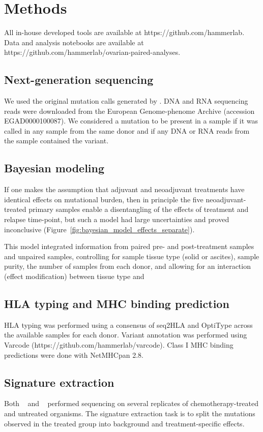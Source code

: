 \section*{Methods}
All in-house developed tools are available at https://github.com/hammerlab. Data and analysis notebooks are available at https://github.com/hammerlab/ovarian-paired-analyses.

\subsection*{Next-generation sequencing}
We used the original mutation calls generated by \cite{Patch_2015}. DNA and RNA sequencing reads were downloaded from the European Genome-phenome Archive (accession EGAD0000100087). We considered a mutation to be present in a sample if it was called in any sample from the same donor and if any DNA or RNA reads from the sample contained the variant.

\subsection*{Bayesian modeling}
If one makes the assumption that adjuvant and neoadjuvant treatments have identical effects on mutational burden, then in principle the five neoadjuvant-treated primary samples enable a disentangling of the effects of treatment and relapse time-point, but such a model had large uncertainties and proved inconclusive (Figure~\ref{fig:bayesian_model_effects_separate}). 

This model integrated information from paired pre- and post-treatment samples and unpaired samples, controlling for sample tissue type (solid or ascites), sample purity, the number of samples from each donor, and allowing for an interaction (effect modification) between tissue type and 
 
\subsection*{HLA typing and MHC binding prediction}
HLA typing was performed using a consensus of seq2HLA\cite{Boegel_2012} and OptiType\cite{Szolek_2014} across the available samples for each donor. Variant annotation was performed using Varcode (https://github.com/hammerlab/varcode). Class I MHC binding predictions were done with NetMHCpan 2.8\cite{Lundegaard_2008}.

\subsection*{Signature extraction}
Both ~\cite{Meier_2014} and ~\cite{Szikriszt_2016} performed sequencing on several replicates of chemotherapy-treated and untreated organisms. The signature extraction task is to split the mutations observed in the treated group into background and treatment-specific effects.


